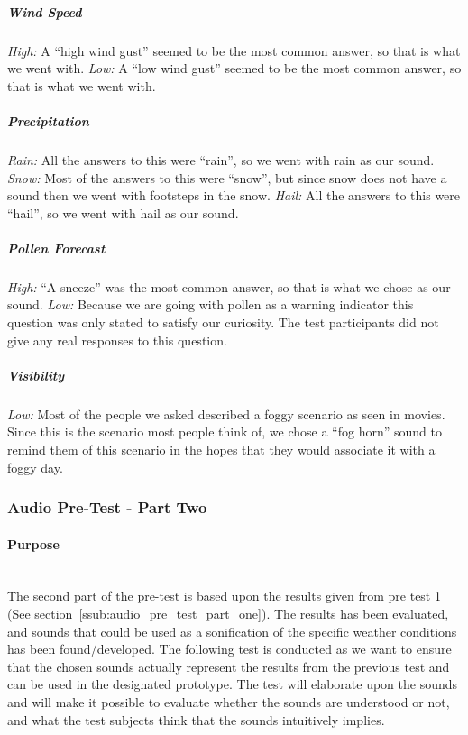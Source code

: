 \subparagraph{Wind Speed} %
\label{subp:wind_speed}
\emph{High:} A \enquote{high wind gust} seemed to be the most common answer, so that is what we went with.
\emph{Low:} A \enquote{low wind gust} seemed to be the most common answer, so that is what we went with.

\subparagraph{Precipitation} %
\label{subp:precipitation}
\emph{Rain:} All the answers to this were \enquote{rain}, so we went with rain as our sound.
\emph{Snow:} Most of the answers to this were \enquote{snow}, but since snow does not have a sound then we went with footsteps in the snow.
\emph{Hail:} All the answers to this were \enquote{hail}, so we went with hail as our sound.

\subparagraph{Pollen Forecast} %
\label{subp:pollen_forecast}
\emph{High:} \enquote{A sneeze} was the most common answer, so that is what we chose as our sound.
\emph{Low:} Because we are going with pollen as a warning indicator this question was only stated to satisfy our curiosity. 
The test participants did not give any real responses to this question. 

\subparagraph{Visibility} %
\label{subp:visibility}
\emph{Low:} Most of the people we asked described a foggy scenario as seen in movies. 
Since this is the scenario most people think of, we chose a \enquote{fog horn} sound to remind them of this scenario in the hopes that they would associate it with a foggy day.




\subsubsection{Audio Pre-Test - Part Two} %
\label{ssub:audio_pre_test_part_two}

\paragraph{Purpose} %
\label{par:pre_test_2_purpose}
\hspace{0pt} \\
The second part of the pre-test is based upon the results given from pre test 1 (See section~\ref{ssub:audio_pre_test_part_one}). 
The results has been evaluated, and sounds that could be used as a sonification of the specific weather conditions has been found/developed. 
The following test is conducted as we want to ensure that the chosen sounds actually represent the results from the previous test and can be used in the designated prototype. 
The test will elaborate upon the sounds and will make it possible to evaluate whether the sounds are understood or not, and what the test subjects think that the sounds intuitively implies.

